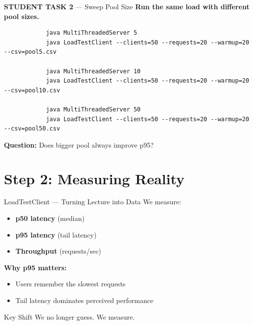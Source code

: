 \documentclass[11pt]{beamer}
\begin{document}
	\begin{frame}[fragile]{\textbf{STUDENT TASK 2} --- Sweep Pool Size}
		\textbf{Run the same load with different pool sizes.}
		
		\begin{lstlisting}
			java MultiThreadedServer 5
			java LoadTestClient --clients=50 --requests=20 --warmup=20 --csv=pool5.csv
			
			java MultiThreadedServer 10
			java LoadTestClient --clients=50 --requests=20 --warmup=20 --csv=pool10.csv
			
			java MultiThreadedServer 50
			java LoadTestClient --clients=50 --requests=20 --warmup=20 --csv=pool50.csv
		\end{lstlisting}
		

		\textbf{Question:} Does bigger pool always improve p95?
	\end{frame}
	
	\section{Step 2: Measuring Reality}
	
	\begin{frame}{LoadTestClient --- Turning Lecture into Data}
		We measure:
		
		\begin{itemize}
			\item \textbf{p50 latency} (median)
			\item \textbf{p95 latency} (tail latency)
			\item \textbf{Throughput} (requests/sec)
		\end{itemize}
		

		
		\textbf{Why p95 matters:}
		\begin{itemize}
			\item Users remember the slowest requests
			\item Tail latency dominates perceived performance
		\end{itemize}

		
		\begin{block}{Key Shift}
			We no longer guess. We measure.
		\end{block}
	\end{frame}
	
\end{document}
